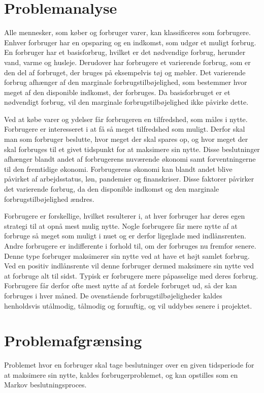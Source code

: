 \section{Problemanalyse}

Alle mennesker, som køber og forbruger varer, kan klassificeres som forbrugere. Enhver forbruger har en opsparing og en indkomst, som udgør et muligt forbrug. En forbruger har et basisforbrug, hvilket er det nødvendige forbrug, herunder vand, varme og husleje. Derudover har forbrugere et varierende forbrug, som er den del af forbruget, der bruges på eksempelvis tøj og møbler. Det varierende forbrug afhænger af den marginale forbrugstilbøjelighed, som bestemmer hvor meget af den disponible indkomst, der forbruges. Da basisforbruget er et nødvendigt forbrug, vil den marginale forbrugstilbøjelighed ikke påvirke dette.

Ved at købe varer og ydelser får forbrugeren en tilfredshed, som måles i nytte. Forbrugere er interesseret i at få så meget tilfredshed som muligt. Derfor skal man som forbruger beslutte, hvor meget der skal spares op, og hvor meget der skal forbruges til et givet tidspunkt for at maksimere sin nytte. Disse beslutninger afhænger blandt andet af forbrugerens nuværende økonomi samt forventningerne til den fremtidige økonomi. Forbrugerens økonomi kan blandt andet blive påvirket af arbejdsstatus, løn, pandemier og finanskriser. Disse faktorer påvirker det varierende forbrug, da den disponible indkomst og den marginale forbrugstilbøjelighed ændres. 

Forbrugere er forskellige, hvilket resulterer i, at hver forbruger har deres egen strategi  til at opnå mest mulig nytte. Nogle forbrugere får mere nytte af at forbruge så meget som muligt i nuet og er derfor ligeglade med indlånsrenten. Andre forbrugere er indifferente i forhold til, om der forbruges nu fremfor senere. Denne type forbruger maksimerer sin nytte ved at have et højt samlet forbrug. Ved en positiv indlånsrente vil denne forbruger dermed maksimere sin nytte ved at forbruge alt til sidst. Typisk er forbrugere mere påpasselige med deres forbrug. Forbrugere får derfor ofte mest nytte af at fordele forbruget ud, så der kan forbruges i hver måned. De ovenstående forbrugstilbøjeligheder kaldes henholdsvis utålmodig, tålmodig og fornuftig, og vil uddybes senere i projektet. 

\section{Problemafgrænsing}
Problemet hvor en forbruger skal tage beslutninger over en given tidsperiode for at maksimere sin nytte, kaldes forbrugerproblemet, og kan opstilles som en Markov beslutningsproces.

